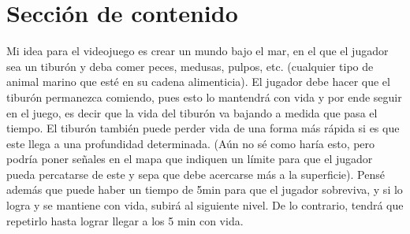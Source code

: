\documentclass{article}
\begin{document}
\section{Sección de contenido} \label{contenido}
Mi idea para el videojuego es crear un mundo bajo el mar, en el que el jugador sea un tiburón y deba comer peces, medusas, pulpos, etc. (cualquier tipo de animal marino que esté en su cadena alimenticia). El jugador debe hacer que el tiburón permanezca comiendo, pues esto lo mantendrá con vida y por ende seguir en el juego, es decir que la vida del tiburón va bajando a medida que pasa el tiempo. 
El tiburón también puede perder vida de una forma más rápida si es que este llega a una profundidad determinada. (Aún no sé como haría esto, pero podría poner señales en el mapa que indiquen un límite para que el jugador pueda percatarse de este y sepa que debe acercarse más a la superficie).
Pensé además que puede haber un tiempo de 5min para que el jugador sobreviva, y si lo logra y se mantiene con vida, subirá al siguiente nivel. De lo contrario, tendrá que repetirlo hasta lograr llegar a los 5 min con vida.




\end{document}
